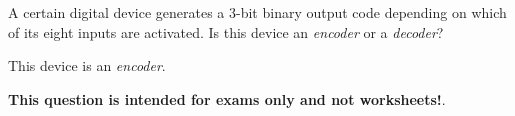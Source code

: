 

A certain digital device generates a 3-bit binary output code depending on which of its eight inputs are activated.  Is this device an {\it encoder} or a {\it decoder}?







This device is an {\it encoder}.







{\bf This question is intended for exams only and not worksheets!}.




